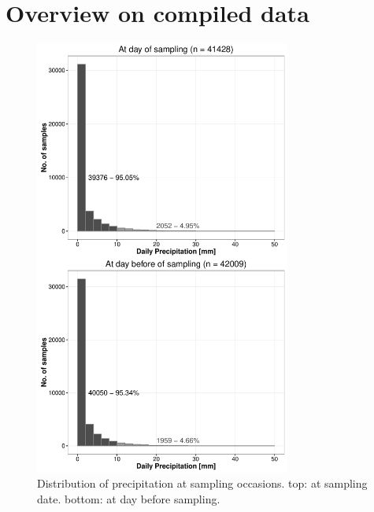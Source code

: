 \documentclass[pdftex,a4paper]{scrreprt}
\begin{document}
\chapter{Overview on compiled data}





\begin{figure}
\centering
\includegraphics[width = 0.75\textwidth]{precip}
\caption{Distribution of precipitation at sampling occasions. top: at sampling date. bottom: at day before sampling.}
\label{fig:precip}
\end{figure}




\end{document}
